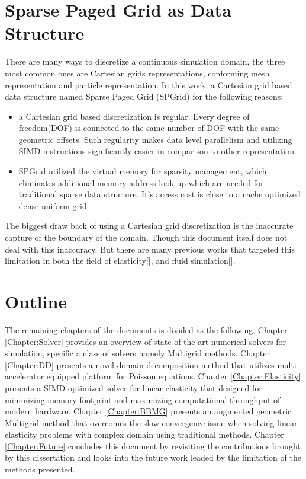 \section{Sparse Paged Grid as Data Structure} 
There are many ways to discretize a continuous simulation domain, the three most common ones are Cartesian grids representations, conforming mesh representation and particle representation. In this work, a Cartesian grid based data structure named Sparse Paged Grid (SPGrid) \cite{setaluri2014spgrid} for the following reasons:
\begin{itemize}
	\item a Cartesian grid based discretization is regular. Every degree of freedom(DOF) is connected to the same number of DOF with the same geometric offsets. Such regularity makes data level parallelism and utilizing SIMD instructions significantly easier in comparison to other representation.
	\item SPGrid utilized the virtual memory for sparsity  management, which eliminates additional memory address look up which are needed for traditional sparse data structure. It's access cost is close to a cache optimized dense uniform grid.
\end{itemize}
The biggest draw back of using a Cartesian grid discretization is the inaccurate capture of the boundary of the domain. Though this document itself does not deal with this inaccuracy. But there are many previous works that targeted this limitation in both the field of elasticity[\cite{zhu2012second}], and fluid simulation[\cite{sethian2003level}]. 

\section{Outline}
The remaining chapters of the documents is divided as the following. Chapter \ref{Chapter:Solver} provides an overview of state of the art numerical solvers for simulation, specific a class of solvers namely Multigrid methods. Chapter \ref{Chapter:DD} presents a novel domain decomposition method that utilizes multi-accelerator equipped platform for Poisson equations. Chapter \ref{Chapter:Elasticity} presents a SIMD optimized solver for linear elasticity that designed for minimizing memory footprint and maximizing computational throughput of modern hardware. Chapter \ref{Chapter:BBMG} presents an augmented geometric Multigrid method that overcomes the slow convergence issue when solving linear elasticity problems with complex domain using traditional methods.  Chapter \ref{Chapter:Future} concludes this document by revisiting the contributions brought by this dissertation and looks into the future work leaded by the limitation of the methods presented.
